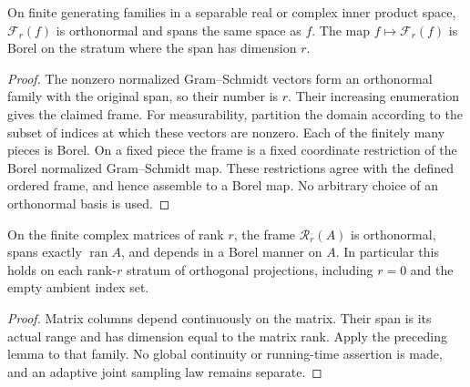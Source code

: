 \begin{lemma}
    \label{lem:borel_finite_ordered_frame}
    \leanok
    On finite generating families in a separable real or complex inner
    product space, $\mathcal F_r(f)$ is orthonormal and spans the same
    space as $f$. The map $f\mapsto\mathcal F_r(f)$ is Borel on the
    stratum where the span has dimension $r$.
\end{lemma}
\begin{proof}\leanok
    The nonzero normalized Gram--Schmidt vectors form an orthonormal family
    with the original span, so their number is $r$. Their increasing
    enumeration gives the claimed frame. For measurability, partition the
    domain according to the subset of indices at which these vectors are
    nonzero. Each of the finitely many pieces is Borel. On a fixed piece
    the frame is a fixed coordinate restriction of the Borel normalized
    Gram--Schmidt map. These restrictions agree with the defined ordered
    frame, and hence assemble to a Borel map. No arbitrary choice of an
    orthonormal basis is used.
\end{proof}

\begin{lemma}
    \label{lem:borel_matrix_range_frame}
    \leanok
    On the finite complex matrices of rank $r$, the frame
    $\mathcal R_r(A)$ is orthonormal, spans exactly $\operatorname{ran}A$,
    and depends in a Borel manner on $A$. In particular this holds on
    each rank-$r$ stratum of orthogonal projections, including $r=0$ and
    the empty ambient index set.
\end{lemma}
\begin{proof}\leanok
    Matrix columns depend continuously on the matrix. Their span is its
    actual range and has dimension equal to the matrix rank. Apply the
    preceding lemma to that family. No global continuity or running-time
    assertion is made, and an adaptive joint sampling law remains separate.
\end{proof}


